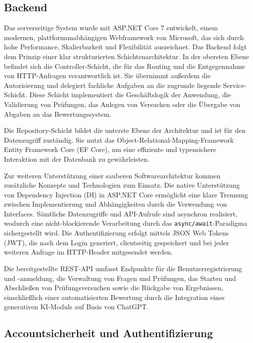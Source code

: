\documentclass[a4paper,12pt]{article}
\begin{document}
\subsection{Backend}

Das serverseitige System wurde mit ASP.NET Core 7 entwickelt, einem modernen, plattformunabhängigen Webframework von Microsoft, das sich durch hohe Performance, Skalierbarkeit und Flexibilität auszeichnet. Das Backend folgt dem Prinzip einer klar strukturierten Schichtenarchitektur. In der obersten Ebene befindet sich die Controller-Schicht, die für das Routing und die Entgegennahme von HTTP-Anfragen verantwortlich ist. Sie übernimmt außerdem die Autorisierung und delegiert fachliche Aufgaben an die zugrunde liegende Service-Schicht. Diese Schicht implementiert die Geschäftslogik der Anwendung, die Validierung von Prüfungen, das Anlegen von Versuchen oder die Übergabe von Abgaben an das Bewertungssystem.

Die Repository-Schicht bildet die unterste Ebene der Architektur und ist für den Datenzugriff zuständig. Sie nutzt das Object-Relational-Mapping-Framework Entity Framework Core (EF Core), um eine effiziente und typensichere Interaktion mit der Datenbank zu gewährleisten.

Zur weiteren Unterstützung einer sauberen Softwarearchitektur kommen zusätzliche Konzepte und Technologien zum Einsatz. Die native Unterstützung von Dependency Injection (DI) in ASP.NET Core ermöglicht eine klare Trennung zwischen Implementierung und Abhängigkeiten durch die Verwendung von Interfaces. Sämtliche Datenzugriffe und API-Aufrufe sind asynchron realisiert, wodurch eine nicht-blockierende Verarbeitung durch das \texttt{async/await}-Paradigma sichergestellt wird. Die Authentifizierung erfolgt mittels JSON Web Tokens (JWT), die nach dem Login generiert, clientseitig gespeichert und bei jeder weiteren Anfrage im HTTP-Header mitgesendet werden.

Die bereitgestellte REST-API umfasst Endpunkte für die Benutzerregistrierung und -anmeldung, die Verwaltung von Fragen und Prüfungen, das Starten und Abschließen von Prüfungsversuchen sowie die Rückgabe von Ergebnissen, einschließlich einer automatisierten Bewertung durch die Integration eines generativen KI-Moduls auf Basis von ChatGPT.


\subsection{Accountsicherheit und Authentifizierung}
\end{document}
